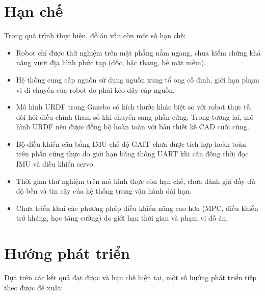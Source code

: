 \section{Hạn chế}

Trong quá trình thực hiện, đồ án vẫn còn một số hạn chế:

\begin{itemize}
    \item Robot chỉ được thử nghiệm trên mặt phẳng nằm ngang, chưa kiểm chứng khả năng vượt địa hình phức tạp (dốc, bậc thang, bề mặt mềm).
    \item Hệ thống cung cấp nguồn sử dụng nguồn xung tổ ong cố định, giới hạn phạm vi di chuyển của robot do phải kéo dây cáp nguồn.
    \item Mô hình URDF trong Gazebo có kích thước khác biệt so với robot thực tế, đòi hỏi điều chỉnh tham số khi chuyển sang phần cứng. Trong tương lai, mô hình URDF nên được đồng bộ hoàn toàn với bản thiết kế CAD cuối cùng.
    \item Bộ điều khiển cân bằng IMU chế độ GAIT chưa được tích hợp hoàn toàn trên phần cứng thực do giới hạn băng thông UART khi cần đồng thời đọc IMU và điều khiển servo.
    \item Thời gian thử nghiệm trên mô hình thực còn hạn chế, chưa đánh giá đầy đủ độ bền và tin cậy của hệ thống trong vận hành dài hạn.
    \item Chưa triển khai các phương pháp điều khiển nâng cao hơn (MPC, điều khiển trở kháng, học tăng cường) do giới hạn thời gian và phạm vi đồ án.
\end{itemize}

\section{Hướng phát triển}

Dựa trên các kết quả đạt được và hạn chế hiện tại, một số hướng phát triển tiếp theo được đề xuất:

